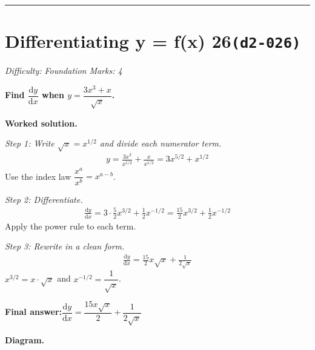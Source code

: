 \documentclass[11pt]{article}
\newcommand{\question}[1]{\par\medskip\noindent\textbf{#1}\par}
\begin{document}
\medskip\hrule

\section*{Differentiating y = f(x) 26\quad\small\texttt{(d2-026)}}
\textit{Difficulty: Foundation \quad\textbar\quad Marks: 4}

\question{Find \( \dfrac{\mathrm{d}y}{\mathrm{d}x} \) when \( y = \dfrac{3x^3 + x}{\sqrt{x}} \).}

\textbf{Worked solution.}

\textit{Step 1: Write \( \sqrt{x} = x^{1/2} \) and divide each numerator term.}
\[\begin{gathered}
y = \frac{3x^3}{x^{1/2}} + \frac{x}{x^{1/2}} = 3x^{5/2} + x^{1/2}
\end{gathered}\]
Use the index law \( \dfrac{x^a}{x^b} = x^{a-b} \).

\textit{Step 2: Differentiate.}
\[\begin{gathered}
\frac{\mathrm{d}y}{\mathrm{d}x} = 3 \cdot \tfrac{5}{2} x^{3/2} + \tfrac{1}{2} x^{-1/2} = \tfrac{15}{2}x^{3/2} + \tfrac{1}{2}x^{-1/2}
\end{gathered}\]
Apply the power rule to each term.

\textit{Step 3: Rewrite in a clean form.}
\[\begin{gathered}
\frac{\mathrm{d}y}{\mathrm{d}x} = \frac{15}{2}x\sqrt{x} + \frac{1}{2\sqrt{x}}
\end{gathered}\]
\( x^{3/2} = x \cdot \sqrt{x} \) and \( x^{-1/2} = \dfrac{1}{\sqrt{x}} \).

\begin{answerbox}
\textbf{Final answer:}\quad \(\displaystyle  \dfrac{\mathrm{d}y}{\mathrm{d}x} = \dfrac{15x\sqrt{x}}{2} + \dfrac{1}{2\sqrt{x}} \)
\end{answerbox}
\textbf{Diagram.}
\end{document}
